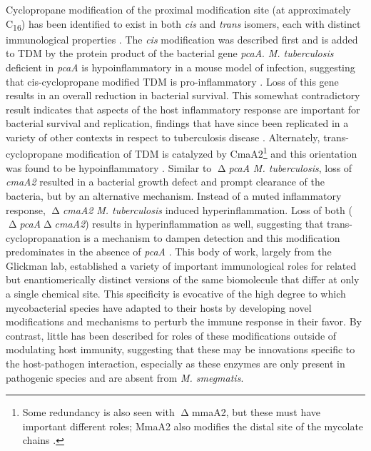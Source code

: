 Cyclopropane modification of the proximal modification site (at approximately C\textsubscript{16}) has been identified to exist in both \textit{cis} and \textit{trans} isomers, each with distinct immunological properties \citep{Glickman2000, Glickman2001a, Rao2005, Rao2006}. The \textit{cis} modification was described first and is added to TDM by the protein product of the bacterial gene \textit{pcaA}. \textit{M. tuberculosis} deficient in \textit{pcaA} is hypoinflammatory in a mouse model of infection, suggesting that cis\hyp{}cyclopropane modified TDM is pro\hyp{}inflammatory \citep{Rao2005}. Loss of this gene results in an overall reduction in bacterial survival. This somewhat contradictory result indicates that aspects of the host inflammatory response are important for bacterial survival and replication, findings that have since been replicated in a variety of other contexts in respect to tuberculosis disease \citep{Huynh2011, Sasindran2011, Tobin2012, Koul2004, Flynn2005}. Alternately, trans\hyp{}cyclopropane modification of TDM is catalyzed by CmaA2\footnote{Some redundancy is also seen with $\upDelta$mmaA2, but these must have important different roles; MmaA2 also modifies the distal site of the mycolate chains \citep{Barkan2010, Glickman2003}.} and this orientation was found to be hypoinflammatory \citep{Rao2006}. Similar to $\upDelta$\textit{pcaA} \textit{M. tuberculosis}, loss of \textit{cmaA2} resulted in a bacterial growth defect and prompt clearance of the bacteria, but by an alternative mechanism. Instead of a muted inflammatory response, $\upDelta$\textit{cmaA2} \textit{M. tuberculosis} induced hyperinflammation. Loss of both ($\upDelta$\textit{pcaA}$\upDelta$\textit{cmaA2}) results in hyperinflammation as well, suggesting that trans\hyp{}cyclopropanation is a mechanism to dampen detection and this modification predominates in the absence of \textit{pcaA} \citep{Barkan2012}. This body of work, largely from the Glickman lab, established a variety of important immunological roles for related but enantiomerically distinct versions of the same biomolecule that differ at only a single chemical site. This specificity is evocative of the high degree to which mycobacterial species have adapted to their hosts by developing novel modifications and mechanisms to perturb the immune response in their favor. By contrast, little has been described for roles of these modifications outside of modulating host immunity, suggesting that these may be innovations specific to the host\hyp{}pathogen interaction, especially as these enzymes are only present in pathogenic species and are absent from \textit{M. smegmatis}.


